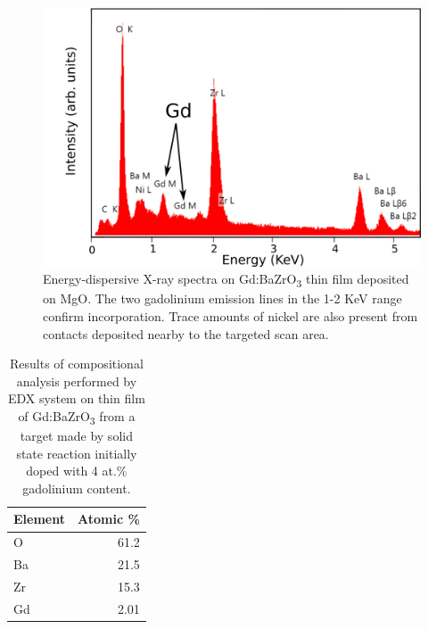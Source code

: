 \begin{figure}
    \centering
    \includegraphics[width=.7\linewidth]{Figures/170714-edx-bzgxs10-mgo-edit.pdf}
    \caption{Energy-dispersive X-ray spectra on Gd:BaZrO\textsubscript{3} thin film deposited on MgO. The two gadolinium emission lines in the 1-2 KeV range confirm incorporation. Trace amounts of nickel are also present from contacts deposited nearby to the targeted scan area.}
    \label{fig:EDX:Gd}
\end{figure}

\begin{table}
    \centering
    \caption{Results of compositional analysis performed by EDX system on thin film of Gd:BaZrO\textsubscript{3} from a target made by solid state reaction initially doped with 4 at.\% gadolinium content.}
    \begin{tabular}{lr}
        \toprule
        Element &  Atomic \% \\
        \midrule
        \midrule
              O &      61.2 \\
             Ba &      21.5 \\
             Zr &      15.3 \\
             Gd &      2.01 \\
        \bottomrule
    \end{tabular}
    \label{tab:film:edx:gd}
\end{table}

    

